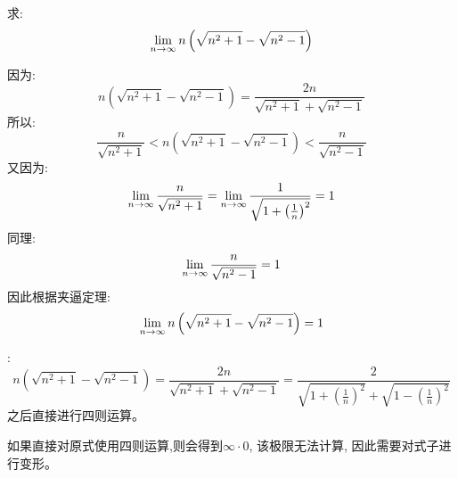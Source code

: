 \begin{example}
    求:
    \begin{equation*}
        \lim_{n \to \infty } n\left( \sqrt{n^2+1} - \sqrt{n^2 - 1}\right)
    \end{equation*}
\end{example}
\begin{solution}
    因为:
    \begin{equation*}
        n\left(\sqrt{n^2+1} - \sqrt{n^2 - 1}\right) = \frac{2n}{\sqrt{n^2+1}+\sqrt{n^2-1}}
    \end{equation*}
    所以:
    \begin{equation*}
        \frac{n}{\sqrt{n^2+1}} < n\left(\sqrt{n^2+1} - \sqrt{n^2 - 1}\right) < \frac{n}{\sqrt{n^2-1}}
    \end{equation*}
    又因为:
    \begin{equation*}
        \lim_{n \to \infty } \frac{n}{\sqrt{n^2+1}} = \lim_{n \to \infty } \frac{1}{\sqrt{1+\left(\frac{1}{n}\right)^2}} = 1
    \end{equation*}
    同理:
    \begin{equation*}
        \lim_{n \to \infty } \frac{n}{\sqrt{n^2-1}} = 1
    \end{equation*}
    因此根据夹逼定理:
    \begin{equation*}
        \lim_{n \to \infty } n\left( \sqrt{n^2+1} - \sqrt{n^2 - 1}\right) = 1
    \end{equation*}

    :
    \begin{equation*}
        n\left(\sqrt{n^2+1} - \sqrt{n^2 - 1}\right) = \frac{2n}{\sqrt{n^2+1}+\sqrt{n^2-1}} = \frac{2}{\sqrt{1+\left(\frac{1}{n}\right)^2}+\sqrt{1-\left(\frac{1}{n}\right)^2}}
    \end{equation*}
    之后直接进行四则运算。
\end{solution}
\begin{remark}
    如果直接对原式使用四则运算,则会得到$\infty \cdot 0$, 该极限无法计算, 因此需要对式子进行变形。
\end{remark}


